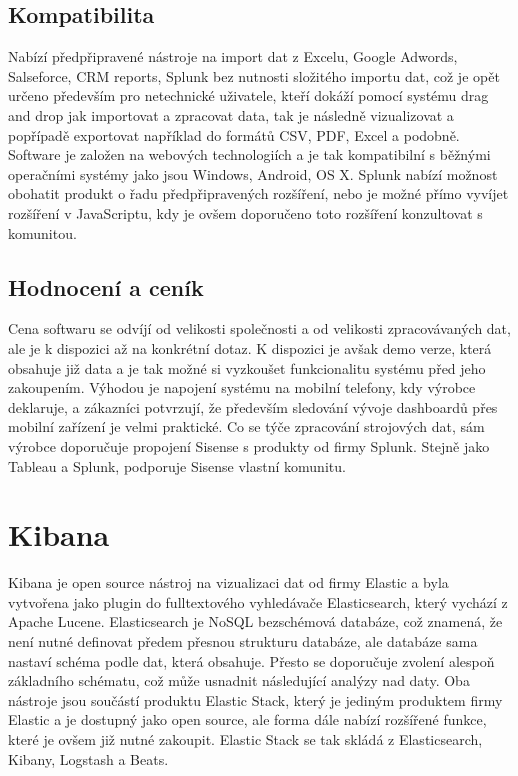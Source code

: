\documentclass[czech,BP]{thesiskiv2}
\begin{document}
 \subsection{Kompatibilita}
  Nabízí předpřipravené nástroje na import dat z Excelu, Google Adwords, Salseforce, CRM reports, Splunk bez nutnosti složitého importu dat, což je opět určeno především pro netechnické uživatele, kteří dokáží pomocí systému drag and drop jak importovat a zpracovat data, tak je následně vizualizovat a popřípadě exportovat například do formátů CSV, PDF, Excel a podobně. Software je založen na webových technologiích a je tak kompatibilní s běžnými operačními systémy jako jsou Windows, Android, OS X. Splunk nabízí možnost obohatit produkt o řadu předpřipravených rozšíření, nebo je možné  přímo vyvíjet rozšíření v JavaScriptu, kdy je ovšem doporučeno toto rozšíření konzultovat s komunitou.\cite{SisenseAdd-ons}
 \subsection{Hodnocení a ceník}
 Cena softwaru se odvíjí od  velikosti společnosti a od velikosti zpracovávaných dat, ale je k dispozici až na konkrétní dotaz. K dispozici je avšak demo verze, která obsahuje již data a je tak možné si vyzkoušet funkcionalitu systému před jeho zakoupením. Výhodou je napojení systému na mobilní telefony, kdy výrobce deklaruje, a zákazníci potvrzují, že především sledování vývoje dashboardů přes mobilní zařízení je velmi praktické. Co se týče zpracování strojových dat, sám výrobce doporučuje propojení Sisense s produkty od firmy Splunk. Stejně jako Tableau a Splunk, podporuje Sisense vlastní komunitu.\cite{SisenseAndSplunk}
 
 
 
 \section{Kibana}
 Kibana je open source nástroj na vizualizaci dat od firmy Elastic a byla vytvořena jako plugin do fulltextového vyhledávače Elasticsearch, který vychází z Apache Lucene. Elasticsearch je NoSQL bezschémová databáze, což znamená, že není nutné definovat předem přesnou strukturu databáze, ale databáze sama nastaví schéma podle dat, která obsahuje. Přesto se doporučuje zvolení alespoň základního schématu, což může usnadnit následující analýzy nad daty.\cite{SchemaElastic} Oba nástroje jsou součástí produktu Elastic Stack, který je jediným produktem firmy Elastic a je dostupný jako open source, ale forma dále nabízí rozšířené funkce, které je ovšem již nutné zakoupit. Elastic Stack se tak skládá z Elasticsearch, Kibany, Logstash a Beats.
 
\end{document}
